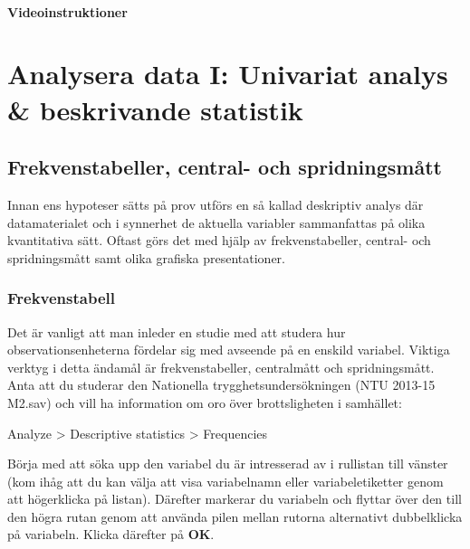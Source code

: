 \documentclass[
]{book}
\begin{document}
\hypertarget{videoinstruktioner-2}{%
\subsection{Videoinstruktioner}\label{videoinstruktioner-2}}

\hypertarget{part-analysera-data-i-univariat-analys-beskrivande-statistik}{%
\part*{Analysera data I: Univariat analys \& beskrivande statistik}\label{part-analysera-data-i-univariat-analys-beskrivande-statistik}}

\hypertarget{frekvenstabeller-central--och-spridningsmuxe5tt}{%
\chapter{Frekvenstabeller, central- och spridningsmått}\label{frekvenstabeller-central--och-spridningsmuxe5tt}}

Innan ens hypoteser sätts på prov utförs en så kallad deskriptiv analys där datamaterialet och i synnerhet de aktuella variabler sammanfattas på olika kvantitativa sätt. Oftast görs det med hjälp av frekvenstabeller, central- och spridningsmått samt olika grafiska presentationer.

\hypertarget{frekvenstabell}{%
\section{Frekvenstabell}\label{frekvenstabell}}

Det är vanligt att man inleder en studie med att studera hur observationsenheterna fördelar sig med
avseende på en enskild variabel. Viktiga verktyg i detta ändamål är frekvenstabeller, centralmått och
spridningsmått. Anta att du studerar den Nationella trygghetsundersökningen (NTU 2013-15 M2.sav)
och vill ha information om oro över brottsligheten i samhället:

Analyze \textgreater{} Descriptive statistics \textgreater{} Frequencies

Börja med att söka upp den variabel du är intresserad av i rullistan till vänster (kom ihåg att du kan
välja att visa variabelnamn eller variabeletiketter genom att högerklicka på listan). Därefter markerar
du variabeln och flyttar över den till den högra rutan genom att använda pilen mellan rutorna alternativt dubbelklicka på variabeln. Klicka därefter på \textbf{OK}.
\end{document}
